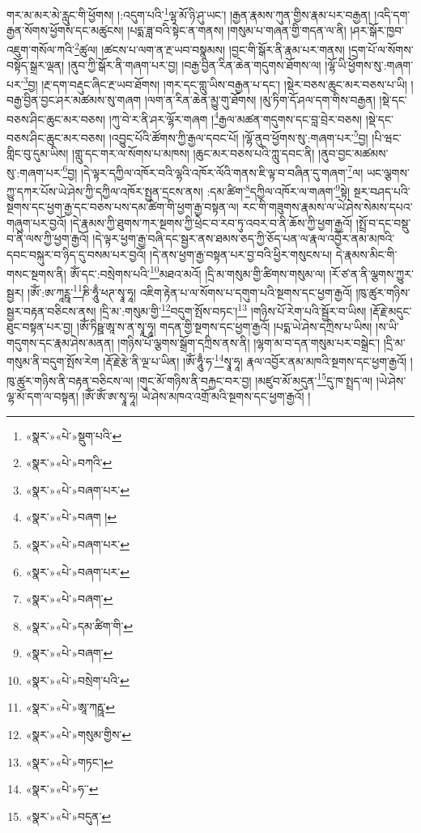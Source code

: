 གར་མ་མར་མེ་རླུང་གི་ཕྱོགས། །:འདུག་པའི་\footnote{«སྣར་»«པེ་»སྡུག་པའི་}ལྷ་མོ་ཉི་ཤུ་ཡང་། །རྒྱན་རྣམས་ཀུན་གྱིས་རྣམ་པར་བརྒྱན། །འདི་དག་རྒྱན་སོགས་ཕྱོགས་དང་མཚུངས། །པདྨ་ཟླ་བའི་སྟེང་ན་གནས། །གསུམ་པ་གཞན་གྱི་གདན་ལ་ནི། །ཤར་སྒོར་ཁྱབ་འཇུག་གསོལ་ཀའི་\footnote{«སྣར་»«པེ་»བཀའི་}ཚུལ། །ཚངས་པ་ལག་ན་རྔ་ཡབ་བསྣམས། །བྱང་གི་སྒོར་ནི་རྣམ་པར་གནས། །དྲག་པོ་ལ་སོགས་བསྟོད་སྒྲར་ལྡན། །ནུབ་ཀྱི་སྒོར་ནི་གཞག་པར་བྱ། །བརྒྱ་བྱིན་རིན་ཆེན་གདུགས་ཐོགས་ལ། །ལྷོ་ཡི་ཕྱོགས་སུ་:གཞག་པར་\footnote{«སྣར་»«པེ་»བཞག་པར་}བྱ། །རྔ་དག་བརྡུང་ཞིང་རྔ་ཡབ་ཐོགས། །གར་དང་གླུ་ཡིས་བརྒྱན་པ་དང་། །སྡེར་བཅས་ཆུང་མར་བཅས་པ་ཡི། །བརྒྱ་བྱིན་བྱང་ཤར་མཚམས་སུ་གཞག །ལག་ན་རིན་ཆེན་མྱུ་གུ་ཐོགས། །མུ་ཏིག་དོ་ཤལ་དག་གིས་བརྒྱན། །སྡེ་དང་བཅས་ཤིང་ཆུང་མར་བཅས། །ཀུ་བེ་ར་ནི་ཤར་ལྷོར་གཞག །\footnote{«སྣར་»«པེ་»བཞག །}རྒྱལ་མཚན་གདུགས་དང་བླ་བྲེར་བཅས། །སྡེ་དང་བཅས་ཤིང་ཆུང་མར་བཅས། །འབྱུང་པོའི་ཚོགས་ཀྱི་རྒྱལ་དབང་པོ། །ལྷོ་ནུབ་ཕྱོགས་སུ་:གཞག་པར་\footnote{«སྣར་»«པེ་»བཞག་པར་}བྱ། །པི་ཝང་གླིང་བུ་དུམ་ཡིས། །གླུ་དང་གར་ལ་སོགས་པ་མཁས། །ཆུང་མར་བཅས་པའི་ཀླུ་དབང་ནི། །ནུབ་བྱང་མཚམས་སུ་:གཞག་པར་\footnote{«སྣར་»«པེ་»བཞག་པར་}བྱ། །དེ་ལྟར་དཀྱིལ་འཁོར་བའི་ལྷའི་འཁོར་ལོའི་གནས་ཇི་ལྟ་བ་བཞིན་དུ་གཞག་\footnote{«སྣར་»«པེ་»བཞག་}ལ། ཡང་ལྕགས་ཀྱུ་དཀར་པོས་ཡེ་ཤེས་ཀྱི་དཀྱིལ་འཁོར་སྤྱན་དྲངས་ནས། :དམ་ཚིག་\footnote{«སྣར་»«པེ་»དམ་ཚིག་གི་}དཀྱིལ་འཁོར་ལ་གཞག་\footnote{«སྣར་»«པེ་»བཞག་}སྟེ། སྔར་བཤད་པའི་སྔགས་དང་ཕྱག་རྒྱ་དང་བཅས་པས་དམ་ཚིག་གི་ཕྱག་རྒྱ་བསྟན་ལ། རང་གི་གཟུགས་རྣམས་ལ་ཡེ་ཤེས་སེམས་དཔའ་གཞུག་པར་བྱའོ། །དེ་རྣམས་ཀྱི་ཐུགས་ཀར་སྔགས་ཀྱི་ཕྲེང་བ་རབ་ཏུ་འབར་བ་ནི་ཆོས་ཀྱི་ཕྱག་རྒྱའོ། །སྤྲོ་བ་དང་བསྡུ་བ་ནི་ལས་ཀྱི་ཕྱག་རྒྱའོ། །དེ་ལྟར་ཕྱག་རྒྱ་བཞི་དང་སྦྱར་ནས་ཐམས་ཅད་ཀྱི་ཅོད་པན་ལ་རྣལ་འབྱོར་ནམ་མཁའི་དབང་བསྐུར་བ་ཉིད་དུ་བསམ་པར་བྱའོ། །དེ་ནས་ཕྱག་རྒྱ་བསྟན་པར་བྱ་བའི་ཕྱིར་གསུངས་པ། དེ་རྣམས་མིང་གི་གསང་སྔགས་ནི། ཨོཾ་དང་:བསྲེགས་པའི་\footnote{«སྣར་»«པེ་»བསྲེག་པའི་}མཐའ་མའོ། །དྲི་མ་གསུམ་གྱི་ཚིགས་གསུམ་ལ། །རོ་ཙ་ན་ནི་ལྕགས་ཀྱུར་སྦྱར། །ཨོཾ་:ཨ་ཀཱཪྵཱ་\footnote{«སྣར་»«པེ་»ཨཱ་ཀརྵཱ་}ཎི་ཧཱུྃ་ཕཊ་སྭཱ་ཧཱ། འཇིག་རྟེན་པ་ལ་སོགས་པ་དགུག་པའི་སྔགས་དང་ཕྱག་རྒྱའོ། །ཁུ་ཚུར་གཉིས་སྦྱར་བརྟན་བཅིངས་ནས། །དྲི་མ་:གསུམ་གྱི་\footnote{«སྣར་»«པེ་»གསུམ་གྱིས་}བདུག་སྤོས་བཏང་།\footnote{«སྣར་»«པེ་»གཏང་།} །གཉིས་པོ་རེག་པའི་སྦྱོར་བ་ཡིས། །རྡོ་རྗེ་མདུང་ཐུང་བསྟན་པར་བྱ། །ཨོཾ་ཏིཥྛ་ཨཱ་ས་ན་སྭཱ་ཧཱ། གདན་གྱི་སྔགས་དང་ཕྱག་རྒྱའོ། །པདྨ་ཡེ་ཤེས་དཀྲིས་པ་ཡིས། །ས་ཡི་གདུགས་དང་རྣམ་ཤེས་མནན། །གཉིས་པོ་ལྕགས་སྒྲོག་དཀྲིས་ནས་ནི། །ལྷག་མ་བ་དན་གསུམ་པར་བསྒྲེང་། །དྲི་མ་གསུམ་ནི་བདུག་སྤོས་རེག །རྡོ་རྗེ་རྩེ་ནི་ལྔ་པ་ཡིན། །ཨོཾ་ཧཱུྃ་ཧ་\footnote{«སྣར་»«པེ་»ཧ་་}སྭཱ་ཧཱ། རྣལ་འབྱོར་ནམ་མཁའི་སྔགས་དང་ཕྱག་རྒྱའོ། །ཁུ་ཚུར་གཉིས་ནི་བརྟན་བཅིངས་ལ། །གུང་མོ་གཉིས་ནི་བརྐྱང་བར་བྱ། །མཛུབ་མོ་མདུན་\footnote{«སྣར་»«པེ་»བདུན་}དུ་ཁ་སྤྲད་ལ། །ཡེ་ཤེས་ལྷ་མོ་དག་ལ་བསྟན། །ཨོཾ་ཨོཾ་ཨ་སྭཱ་ཧཱ། ཡེ་ཤེས་མཁའ་འགྲོ་མའི་སྔགས་དང་ཕྱག་རྒྱའོ། །
